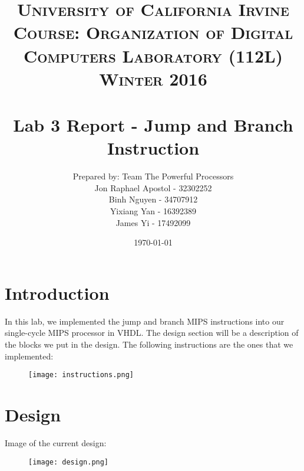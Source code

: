 \documentclass[paper=letter, fontsize=11pt]{scrartcl} %
\title{	
\normalfont \normalsize 
\textsc{University of California Irvine} 
\textsc{Course: Organization of Digital Computers Laboratory (112L) \\ Winter 2016} \\ [25pt]
\horrule{0.5pt} \\[0.4cm] %
\huge Lab 3 Report - Jump and Branch Instruction\/
\horrule{2pt} \\[0.5cm] %
}
\author{Prepared by: Team The Powerful Processors \\ Jon Raphael Apostol - 32302252 \\ Binh Nguyen - 34707912 \\ Yixiang Yan - 16392389 \\ James Yi - 17492099 } %
\date{\normalsize\today} %
\numberwithin{equation}{section}
\numberwithin{figure}{section}
\numberwithin{table}{section}
\begin{document}
\maketitle %


\section{Introduction}
In this lab, we implemented the jump and branch MIPS instructions into our single-cycle MIPS processor in VHDL. The design section will be a description of the blocks we put in the design.
\pagebreak
The following instructions are the ones that we implemented:

\begin{figure}[H]
	\centering
		\texttt{[image: instructions.png]}
	\label{fig:instructions}
\end{figure}



\pagebreak


\section{Design}

\begin{center}
Image of the current design:
\end{center}

\begin{figure}[H]
	\centering
		\texttt{[image: design.png]}
	\label{fig:design}
\end{figure}
\end{document}
